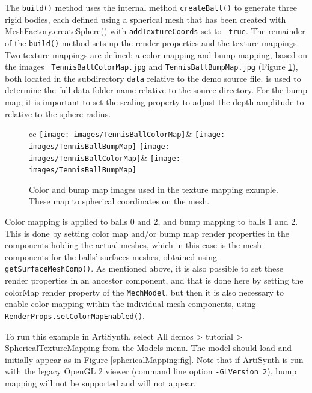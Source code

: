 \lstset{numbers=left}

\lstset{numbers=none}

The {\tt build()} method uses the internal method {\tt createBall()}
to generate three rigid bodies, each defined using a spherical mesh
that has been created with
%
{MeshFactory.createSphere()} with {\tt addTextureCoords} set to {\tt
true}.  The remainder of the {\tt build()} method sets up the render
properties and the texture mappings. Two texture mappings are defined:
a color mapping and bump mapping, based on the images {\tt
TennisBallColorMap.jpg} and {\tt TennisBallBumpMap.jpg} (Figure
\ref{mappingImages:fig}), both located in the subdirectory {\tt data}
relative to the demo source file.
 is used to determine
the full data folder name relative to the source directory.
For the bump map, it is important to set the {\sf scaling} property
to adjust the depth amplitude to relative to the sphere radius.

\begin{figure}[ht]
\begin{center}
\begin{tabular}{cc}
   \iflatexml
      \texttt{[image: images/TennisBallColorMap]}&
      \texttt{[image: images/TennisBallBumpMap]}
   \else
      \texttt{[image: images/TennisBallColorMap]}&
      \texttt{[image: images/TennisBallBumpMap]}
   \fi
\end{tabular}
\end{center}
\caption{Color and bump map images used in the texture mapping example.
These map to spherical coordinates on the mesh.}
\label{mappingImages:fig}
\end{figure}

Color mapping is applied to balls 0 and 2, and bump mapping to balls 1
and 2. This is done by setting color map and/or bump map render
properties in the components holding the actual meshes, which in this
case is the mesh components for the balls' surfaces meshes, obtained
using {\tt getSurfaceMeshComp()}. As mentioned above, it is also
possible to set these render properties in an ancestor component, and
that is done here by setting the {\sf colorMap} render property of the
{\tt MechModel}, but then it is also necessary to enable color mapping
within the individual mesh components, using {\tt
RenderProps.setColorMapEnabled()}.

To run this example in ArtiSynth, select {\sf All demos > tutorial >
SphericalTextureMapping} from the {\sf Models} menu. The model should
load and initially appear as in Figure
\ref{sphericalMapping:fig}. Note that if ArtiSynth is run with the
legacy OpenGL 2 viewer (command line option {\tt -GLVersion 2}), bump
mapping will not be supported and will not appear.

